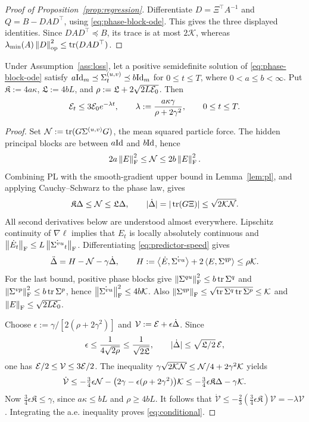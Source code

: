 \begin{proof}[Proof of Proposition~\ref{prop:regression}]
Differentiate $D=\Xi^\top A^{-1}$ and $Q=B-DAD^\top$, using
\eqref{eq:phase-block-ode}. This gives the three displayed identities.
Since $DAD^\top\preceq B$, its trace is at most $2\mathcal{K}$, whereas
$\lambda_{\min}(A)\left\lVert D \right\rVert_{\mathrm{op}}^2\le\operatorname{tr}(DAD^\top)$.
\end{proof}
\begin{lemma}\label{lem:conditional}
Under Assumption~\ref{ass:loss}, let a positive semidefinite solution of
\eqref{eq:phase-block-ode} satisfy $a\mathrm{Id}_m\preceq\Sigma^{(u,v)}_t\preceq b\mathrm{Id}_m$ for
$0\le t\le T$, where $0<a\le b<\infty$. Put
$\mathfrak K:=4a\kappa$, $\mathfrak L:=4bL$, and
$\rho:=\mathfrak L+2\sqrt{2L\mathcal E_0}$. Then
\begin{equation}\label{eq:conditional}
 \mathcal E_t\le3\mathcal E_0 e^{-\lambda t},\qquad
 \lambda:=\frac{a\kappa\gamma}{\rho+2\gamma^2},\qquad 0\le t\le T.
\end{equation}
\end{lemma}
\begin{proof}
Set $\mathcal N:=\operatorname{tr}(G\Sigma^{(u,v)} G)$, the mean squared particle force.
The hidden principal blocks are between $a\mathrm{Id}$ and $b\mathrm{Id}$, hence
\[
 2a\left\lVert E \right\rVert_{\mathrm{F}}^2\le\mathcal N\le2b\left\lVert E \right\rVert_{\mathrm{F}}^2.
\]
Combining PL with the smooth-gradient upper bound in
Lemma~\ref{lem:pl}, and applying Cauchy--Schwarz to the phase law, gives
\begin{equation}\label{eq:conditional-force-bounds}
 \mathfrak K\Delta\le \mathcal N\le\mathfrak L\Delta,\qquad
 |\dot\Delta|=|\operatorname{tr}(G\Xi)|\le\sqrt{2\mathcal{K} \mathcal N}.
\end{equation}
All second derivatives below are understood almost everywhere. Lipschitz
continuity of $\nabla\ell$ implies that $E_t$ is locally absolutely
continuous and $\left\lVert \dot E_t \right\rVert_{\mathrm{F}}\le L\left\lVert \dot{\Sigma^{vu}}_t \right\rVert_{\mathrm{F}}$.
Differentiating \eqref{eq:predictor-speed} gives
\[
 \ddot\Delta=H-\mathcal N-\gamma\dot\Delta,\qquad
 H:=\left\langle \dot E,\dot{\Sigma^{vu}} \right\rangle+2\left\langle E,\Sigma^{qp} \right\rangle\le\rho\mathcal{K}.
\]
For the last bound, positive phase blocks give
$\left\lVert \Sigma^{qu} \right\rVert_{\mathrm{F}}^2\le b\operatorname{tr}\Sigma^q$ and
$\left\lVert \Sigma^{vp} \right\rVert_{\mathrm{F}}^2\le b\operatorname{tr}\Sigma^p$, hence
$\left\lVert \dot{\Sigma^{vu}} \right\rVert_{\mathrm{F}}^2\le4b\mathcal{K}$. Also
$\left\lVert \Sigma^{qp} \right\rVert_{\mathrm{F}}\le\sqrt{\operatorname{tr}\Sigma^q\operatorname{tr}\Sigma^p}\le\mathcal{K}$ and
$\left\lVert E \right\rVert_{\mathrm{F}}\le\sqrt{2L\mathcal E_0}$.

Choose $\epsilon:=\gamma/[2(\rho+2\gamma^2)]$ and
$\mathcal V:=\mathcal E+\epsilon\dot\Delta$. Since
\[
 \epsilon\le\frac1{4\sqrt{2\rho}}
 \le\frac1{\sqrt{2\mathfrak L}},\qquad
 |\dot\Delta|\le\sqrt{\mathfrak L/2}\,\mathcal E,
\]
one has $\mathcal E/2\le\mathcal V\le3\mathcal E/2$.
The inequality $\gamma\sqrt{2\mathcal{K} \mathcal N}\le \mathcal N/4+2\gamma^2\mathcal{K}$ yields
\[
 \dot{\mathcal V}\le-\tfrac34\epsilon \mathcal N
       -\bigl(2\gamma-\epsilon(\rho+2\gamma^2)\bigr)\mathcal{K}
 \le-\tfrac34\epsilon\mathfrak K\Delta-\gamma\mathcal{K}.
\]
Now $\tfrac34\epsilon\mathfrak K\le\gamma$, since $a\kappa\le bL$
and $\rho\ge4bL$. It follows that
$\dot{\mathcal V}\le-\tfrac23(\tfrac34\epsilon\mathfrak K)\mathcal V
=-\lambda\mathcal V$.
Integrating the a.e. inequality proves \eqref{eq:conditional}.

\end{proof}


